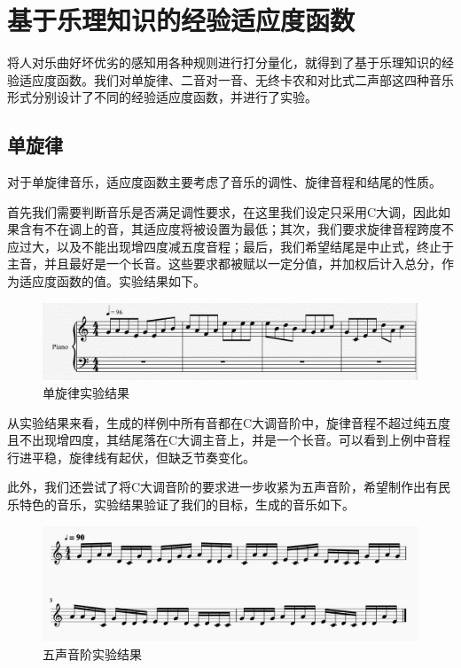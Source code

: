 \documentclass[UTF8,a4paper,10pt]{ctexart}
\begin{document}
    \section{\textcolor[rgb]{0,0.3,0.6}{基于乐理知识的经验适应度函数}}
    将人对乐曲好坏优劣的感知用各种规则进行打分量化，就得到了基于乐理知识的经验适应度函数。我们对单旋律、二音对一音、无终卡农和对比式二声部这四种音乐形式分别设计了不同的经验适应度函数，并进行了实验。
    \subsection{单旋律}
    对于单旋律音乐，适应度函数主要考虑了音乐的调性、旋律音程和结尾的性质。\par
    首先我们需要判断音乐是否满足调性要求，在这里我们设定只采用C大调，因此如果含有不在调上的音，其适应度将被设置为最低；其次，我们要求旋律音程跨度不应过大，以及不能出现增四度减五度音程；最后，我们希望结尾是中止式，终止于主音，并且最好是一个长音。这些要求都被赋以一定分值，并加权后计入总分，作为适应度函数的值。实验结果如下。
    \begin{figure}[H]
        \begin{center}
            \includegraphics[width=1.0\columnwidth]{eg1.PNG}
            \caption{单旋律实验结果}
        \end{center}
    \end{figure}    
    从实验结果来看，生成的样例中所有音都在C大调音阶中，旋律音程不超过纯五度且不出现增四度，其结尾落在C大调主音上，并是一个长音。可以看到上例中音程行进平稳，旋律线有起伏，但缺乏节奏变化。\par
    此外，我们还尝试了将C大调音阶的要求进一步收紧为五声音阶，希望制作出有民乐特色的音乐，实验结果验证了我们的目标，生成的音乐如下。
    \begin{figure}[H]
        \begin{center}
            \includegraphics[width=1.0\columnwidth]{five.png}
            \caption{五声音阶实验结果}
        \end{center}
    \end{figure} 
\end{document}
